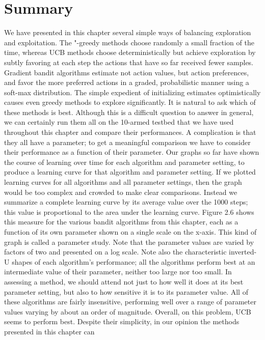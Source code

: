 \section{Summary}
\label{sec:mab-summary}
We have presented in this chapter several simple ways of balancing exploration and
exploitation. The "-greedy methods choose randomly a small fraction of the time, whereas
UCB methods choose deterministically but achieve exploration by subtly favoring at each
step the actions that have so far received fewer samples. Gradient bandit algorithms
estimate not action values, but action preferences, and favor the more preferred actions
in a graded, probabilistic manner using a soft-max distribution. The simple expedient of
initializing estimates optimistically causes even greedy methods to explore significantly.
It is natural to ask which of these methods is best. Although this is a difficult question
to answer in general, we can certainly run them all on the 10-armed testbed that we
have used throughout this chapter and compare their performances. A complication is
that they all have a parameter; to get a meaningful comparison we have to consider
their performance as a function of their parameter. Our graphs so far have shown the
course of learning over time for each algorithm and parameter setting, to produce a
learning curve for that algorithm and parameter setting. If we plotted learning curves
for all algorithms and all parameter settings, then the graph would be too complex and
crowded to make clear comparisons. Instead we summarize a complete learning curve
by its average value over the 1000 steps; this value is proportional to the area under the
learning curve. Figure 2.6 shows this measure for the various bandit algorithms from
this chapter, each as a function of its own parameter shown on a single scale on the
x-axis. This kind of graph is called a parameter study. Note that the parameter values
are varied by factors of two and presented on a log scale. Note also the characteristic
inverted-U shapes of each algorithm’s performance; all the algorithms perform best at
an intermediate value of their parameter, neither too large nor too small. In assessing
a method, we should attend not just to how well it does at its best parameter setting,
but also to how sensitive it is to its parameter value. All of these algorithms are fairly
insensitive, performing well over a range of parameter values varying by about an order
of magnitude. Overall, on this problem, UCB seems to perform best.
Despite their simplicity, in our opinion the methods presented in this chapter can
